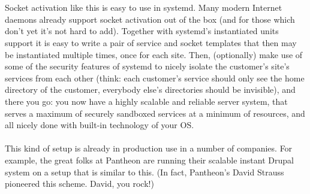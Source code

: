 \documentclass[titlepage]{article}
\begin{document}
\\
\\
Socket activation like this is easy to use in systemd. Many modern Internet daemons already support socket activation out of the box (and for those which don't yet it's not hard to add). Together with systemd's instantiated units support it is easy to write a pair of service and socket templates that then may be instantiated multiple times, once for each site. Then, (optionally) make use of some of the security features of systemd to nicely isolate the customer's site's services from each other (think: each customer's service should only see the home directory of the customer, everybody else's directories should be invisible), and there you go: you now have a highly scalable and reliable server system, that serves a maximum of securely sandboxed services at a minimum of resources, and all nicely done with built-in technology of your OS.
\\
\\
This kind of setup is already in production use in a number of companies. For example, the great folks at Pantheon are running their scalable instant Drupal system on a setup that is similar to this. (In fact, Pantheon's David Strauss pioneered this scheme. David, you rock!)
\end{document}
